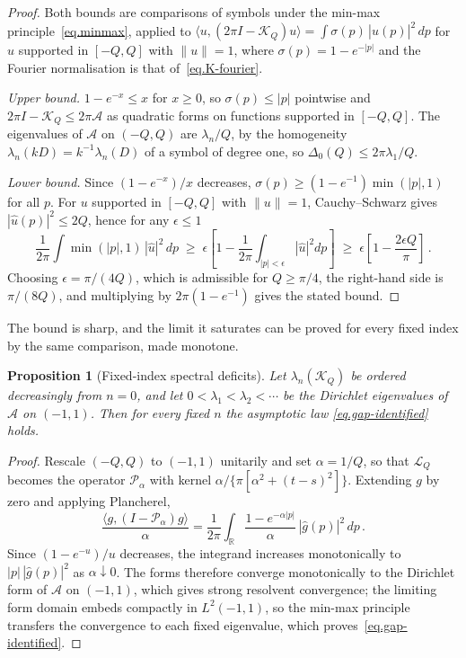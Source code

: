 \documentclass[11pt,a4paper]{article}
\newtheorem{proposition}[theorem]{Proposition}
\theoremstyle{definition}
\begin{document}
\begin{proof}
Both bounds are comparisons of symbols under the min-max
principle~\eqref{eq.minmax}, applied to
$\langle u, (2\pi I - \mathcal{K}_Q)u\rangle
= \int \sigma(p)\,|\hat u(p)|^2\,dp$ for $u$ supported in $[-Q,Q]$ with
$\|u\| = 1$, where $\sigma(p) = 1-e^{-|p|}$ and the Fourier normalisation is
that of~\eqref{eq.K-fourier}.

\emph{Upper bound.}  $1-e^{-x} \leq x$ for $x \geq 0$, so
$\sigma(p) \leq |p|$ pointwise and $2\pi I - \mathcal{K}_Q \leq 2\pi\mathcal{A}$
as quadratic forms on functions supported in $[-Q,Q]$.  The eigenvalues of
$\mathcal{A}$ on $(-Q,Q)$ are $\lambda_n/Q$, by the homogeneity
$\lambda_n(kD) = k^{-1}\lambda_n(D)$ of a symbol of degree one, so
$\Delta_0(Q) \leq 2\pi\lambda_1/Q$.

\emph{Lower bound.}  Since $(1-e^{-x})/x$ decreases,
$\sigma(p) \geq (1-e^{-1})\min(|p|,1)$ for all $p$.  For $u$ supported in
$[-Q,Q]$ with $\|u\|=1$, Cauchy--Schwarz gives $|\hat u(p)|^2 \leq 2Q$, hence
for any $\epsilon \leq 1$
\begin{equation}
  \frac{1}{2\pi}\int \min(|p|,1)\,|\hat u|^2\,dp
  \;\geq\; \epsilon\left[1 - \frac{1}{2\pi}\int_{|p|<\epsilon}|\hat u|^2 dp\right]
  \;\geq\; \epsilon\left[1 - \frac{2\epsilon Q}{\pi}\right]\,.
\end{equation}
Choosing $\epsilon = \pi/(4Q)$, which is admissible for $Q \geq \pi/4$, the
right-hand side is $\pi/(8Q)$, and multiplying by $2\pi(1-e^{-1})$ gives the
stated bound.
\end{proof}

The bound is sharp, and the limit it saturates can be proved for every fixed
index by the same comparison, made monotone.

\begin{proposition}[Fixed-index spectral deficits]\label{prop:deficits}
  Let $\lambda_n(\mathcal{K}_Q)$ be ordered decreasingly from $n = 0$, and let
  $0 < \lambda_1 < \lambda_2 < \cdots$ be the Dirichlet eigenvalues of
  $\mathcal{A}$ on $(-1,1)$.  Then for every fixed $n$ the asymptotic law
  \eqref{eq.gap-identified} holds.
\end{proposition}

\begin{proof}
Rescale $(-Q,Q)$ to $(-1,1)$ unitarily and set $\alpha = 1/Q$, so that
$\mathcal{L}_Q$ becomes the operator $\mathcal{P}_\alpha$ with kernel
$\alpha/\{\pi[\alpha^2+(t-s)^2]\}$.  Extending $g$ by zero and applying
Plancherel,
\begin{equation}\label{eq.monotone-form}
  \frac{\langle g, (I-\mathcal{P}_\alpha)g\rangle}{\alpha}
  = \frac{1}{2\pi}\int_{\mathbb{R}}
    \frac{1-e^{-\alpha|p|}}{\alpha}\,|\hat g(p)|^2\,dp\,.
\end{equation}
Since $(1-e^{-u})/u$ decreases, the integrand increases monotonically to
$|p|\,|\hat g(p)|^2$ as $\alpha \downarrow 0$.  The forms therefore converge
monotonically to the Dirichlet form of $\mathcal{A}$ on $(-1,1)$, which gives
strong resolvent convergence; the limiting form domain embeds compactly in
$L^2(-1,1)$, so the min-max principle~\cite{ReedSimonIV} transfers the
convergence to each fixed eigenvalue, which proves~\eqref{eq.gap-identified}.
\end{proof}
\end{document}
